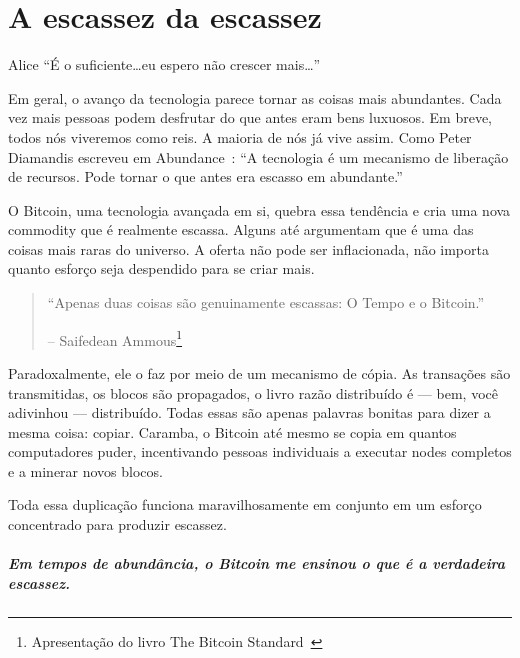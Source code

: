 
\chapter{A escassez da escassez}
\label{les:2}

\begin{chapquote}{Alice}
\enquote{É o suficiente\ldots eu espero não crescer mais\ldots}
\end{chapquote}

Em geral, o avanço da tecnologia parece tornar as coisas mais abundantes. Cada vez mais pessoas podem desfrutar do que antes eram bens luxuosos. Em breve, todos nós viveremos como reis. A maioria de nós já vive assim. Como Peter Diamandis escreveu em Abundance~\cite{abundance}: \enquote{A tecnologia é um mecanismo de liberação de recursos. Pode tornar o que antes era escasso em abundante.}

O Bitcoin, uma tecnologia avançada em si, quebra essa tendência e cria uma nova commodity que é realmente escassa. Alguns até argumentam que é uma das coisas mais raras do universo. A oferta não pode ser inflacionada, não importa quanto esforço seja despendido para se criar mais.

\begin{quotation}\begin{samepage}
\enquote{Apenas duas coisas são genuinamente escassas: O Tempo e o Bitcoin.}
\begin{flushright} -- Saifedean Ammous\footnote{Apresentação do livro The Bitcoin Standard~\cite{bitcoinstandard-pres}}
\end{flushright}\end{samepage}\end{quotation}

Paradoxalmente, ele o faz por meio de um mecanismo de cópia. As transações são transmitidas, os blocos são propagados, o livro razão distribuído é --- bem, você adivinhou --- distribuído. Todas essas são apenas palavras bonitas para dizer a mesma coisa: copiar. Caramba, o Bitcoin até mesmo se copia em quantos computadores puder, incentivando pessoas individuais a executar nodes completos e a minerar novos blocos.

Toda essa duplicação funciona maravilhosamente em conjunto em um esforço concentrado para produzir escassez.

\paragraph{Em tempos de abundância, o Bitcoin me ensinou o que é a verdadeira escassez.}

